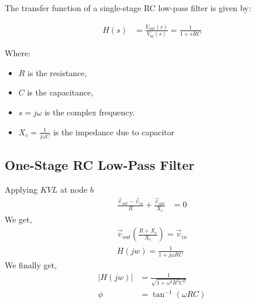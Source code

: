 \documentclass[a4paper,12pt]{article}
\begin{document}
The transfer function of a single-stage RC low-pass filter is given by:

\begin{align*}
H(s) &= \frac{V_{\text{out}}(s)}{V_{\text{in}}(s)} = \frac{1}{1 + sRC}
\end{align*}

Where:
\begin{itemize}
    \item $ R $ is the resistance,
    \item $ C $ is the capacitance,
    \item $ s = j\omega $ is the complex frequency.
    \item $X_c = \frac{1}{j\omega C}$ is the impedance due to capacitor
\end{itemize}

\subsection*{One-Stage RC Low-Pass Filter}
\pagebreak
\begin{figure}[!h]
\centering
{}%
\label{one-cascade}
\end{figure}
Applying $KVL$ at node $b$
\begin{align*}
    \frac{\vec{v}_{out} - \vec{v}_{in}}{R} + \frac{\vec{v}_{out}}{X_c} &= 0
\end{align*}
We get, 
\begin{align*}
    \vec{v}_{out} \left( \frac{R+X_c}{X_c} \right) = \vec{v}_{in}\\
    H(jw) =  \frac{1}{1+j\omega RC}
\end{align*}
We finally get,
\begin{align*}
    |H(jw)| &= \frac{1}{\sqrt{1 + \omega^2 R^2 C^2}}\\
    \phi &= \tan^{-1}\left( \omega RC\right)
\end{align*}
\end{document}
